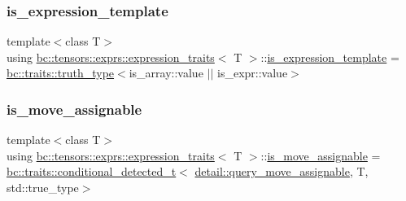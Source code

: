\mbox{\label{structbc_1_1tensors_1_1exprs_1_1expression__traits_a0495b9445a4aaec1596b5b0c4a05c4c4}} 
\subsubsection{\texorpdfstring{is\+\_\+expression\+\_\+template}{is\_expression\_template}}
{\footnotesize\ttfamily template$<$class T$>$ \\
using \hyperlink{structbc_1_1tensors_1_1exprs_1_1expression__traits}{bc\+::tensors\+::exprs\+::expression\+\_\+traits}$<$ T $>$\+::\hyperlink{structbc_1_1tensors_1_1exprs_1_1expression__traits_a0495b9445a4aaec1596b5b0c4a05c4c4}{is\+\_\+expression\+\_\+template} =  \hyperlink{namespacebc_1_1traits_ac91a9795000ae7f483efbaf74c9872e8}{bc\+::traits\+::truth\+\_\+type}$<$is\+\_\+array\+::value $\vert$$\vert$ is\+\_\+expr\+::value$>$}

\mbox{\label{structbc_1_1tensors_1_1exprs_1_1expression__traits_ae32e2d333f9a7eed4baee44455cf7b46}} 
\subsubsection{\texorpdfstring{is\+\_\+move\+\_\+assignable}{is\_move\_assignable}}
{\footnotesize\ttfamily template$<$class T$>$ \\
using \hyperlink{structbc_1_1tensors_1_1exprs_1_1expression__traits}{bc\+::tensors\+::exprs\+::expression\+\_\+traits}$<$ T $>$\+::\hyperlink{structbc_1_1tensors_1_1exprs_1_1expression__traits_ae32e2d333f9a7eed4baee44455cf7b46}{is\+\_\+move\+\_\+assignable} =  \hyperlink{namespacebc_1_1traits_a1a6d378947ec32acd457890854bcd592}{bc\+::traits\+::conditional\+\_\+detected\+\_\+t}$<$ \hyperlink{namespacebc_1_1tensors_1_1exprs_1_1detail_ac325e0e2cef5518953db86853d9780fc}{detail\+::query\+\_\+move\+\_\+assignable}, T, std\+::true\+\_\+type$>$}

